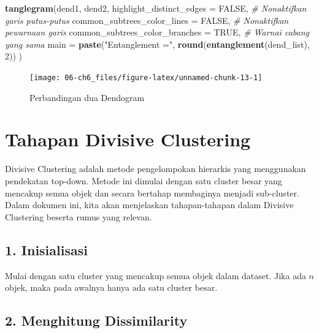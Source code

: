 \documentclass[
  oneside]{book}
\newenvironment{Shaded}{\begin{snugshade}}{\end{snugshade}}
\newcommand{\AttributeTok}[1]{\textcolor[rgb]{0.13,0.29,0.53}{#1}}
\newcommand{\CommentTok}[1]{\textcolor[rgb]{0.56,0.35,0.01}{\textit{#1}}}
\newcommand{\ConstantTok}[1]{\textcolor[rgb]{0.56,0.35,0.01}{#1}}
\newcommand{\DecValTok}[1]{\textcolor[rgb]{0.00,0.00,0.81}{#1}}
\newcommand{\FunctionTok}[1]{\textcolor[rgb]{0.13,0.29,0.53}{\textbf{#1}}}
\newcommand{\NormalTok}[1]{#1}
\newcommand{\StringTok}[1]{\textcolor[rgb]{0.31,0.60,0.02}{#1}}
\begin{document}
\begin{Shaded}
\begin{Highlighting}[]
\FunctionTok{tanglegram}\NormalTok{(dend1, dend2,}
           \AttributeTok{highlight\_distinct\_edges =} \ConstantTok{FALSE}\NormalTok{, }\CommentTok{\# Nonaktifkan garis putus{-}putus}
           \AttributeTok{common\_subtrees\_color\_lines =} \ConstantTok{FALSE}\NormalTok{, }\CommentTok{\# Nonaktifkan pewarnaan garis}
           \AttributeTok{common\_subtrees\_color\_branches =} \ConstantTok{TRUE}\NormalTok{, }\CommentTok{\# Warnai cabang yang sama}
           \AttributeTok{main =} \FunctionTok{paste}\NormalTok{(}\StringTok{"Entanglement ="}\NormalTok{, }\FunctionTok{round}\NormalTok{(}\FunctionTok{entanglement}\NormalTok{(dend\_list), }\DecValTok{2}\NormalTok{))}
\NormalTok{)}
\end{Highlighting}
\end{Shaded}

\begin{figure}[h]

{\centering \texttt{[image: 06-ch6\_files/figure-latex/unnamed-chunk-13-1]} 

}

\caption{Perbandingan dua Dendogram}\label{fig:unnamed-chunk-13}
\end{figure}

\section{Tahapan Divisive Clustering}\label{tahapan-divisive-clustering}

Divisive Clustering adalah metode pengelompokan hierarkis yang menggunakan pendekatan top-down. Metode ini dimulai dengan satu cluster besar yang mencakup semua objek dan secara bertahap membaginya menjadi sub-cluster. Dalam dokumen ini, kita akan menjelaskan tahapan-tahapan dalam Divisive Clustering beserta rumus yang relevan.

\subsection*{1. Inisialisasi}\label{inisialisasi-3}

Mulai dengan satu cluster yang mencakup semua objek dalam dataset. Jika ada \(n\) objek, maka pada awalnya hanya ada satu cluster besar.

\subsection*{2. Menghitung Dissimilarity}\label{menghitung-dissimilarity}
\end{document}
